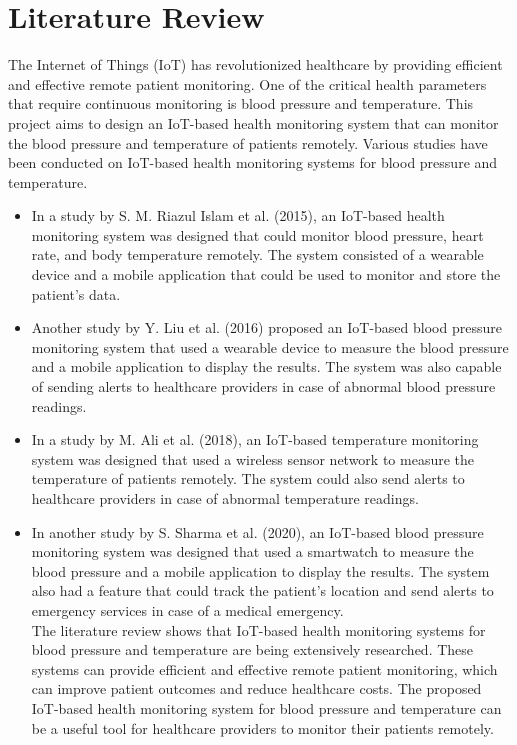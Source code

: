 \documentclass[conference]{IEEEtran}
\begin{document}
\section{Literature Review}
    The Internet of Things (IoT) has revolutionized healthcare by providing efficient and effective remote patient monitoring. One of the critical health parameters that require continuous monitoring is blood pressure and temperature. This project aims to design an IoT-based health monitoring system that can monitor the blood pressure and temperature of patients remotely. Various studies have been conducted on IoT-based health monitoring systems for blood pressure and temperature. \\
    \begin{itemize}

  \item {In a study by S. M. Riazul Islam et al. (2015), an IoT-based health monitoring system was designed that could monitor blood pressure, heart rate, and body temperature remotely. The system consisted of a wearable device and a mobile application that could be used to monitor and store the patient's data.}
\item {Another study by Y. Liu et al. (2016) proposed an IoT-based blood pressure monitoring system that used a wearable device to measure the blood pressure and a mobile application to display the results. The system was also capable of sending alerts to healthcare providers in case of abnormal blood pressure readings.}

\item {In a study by M. Ali et al. (2018), an IoT-based temperature monitoring system was designed that used a wireless sensor network to measure the temperature of patients remotely. The system could also send alerts to healthcare providers in case of abnormal temperature readings.}

\item {In another study by S. Sharma et al. (2020), an IoT-based blood pressure monitoring system was designed that used a smartwatch to measure the blood pressure and a mobile application to display the results. The system also had a feature that could track the patient's location and send alerts to emergency services in case of a medical emergency.}\\
The literature review shows that IoT-based health monitoring systems for blood pressure and temperature are being extensively researched. These systems can provide efficient and effective remote patient monitoring, which can improve patient outcomes and reduce healthcare costs. The proposed IoT-based health monitoring system for blood pressure and temperature can be a useful tool for healthcare providers to monitor their patients remotely.
    




\end{itemize}
\end{document}
